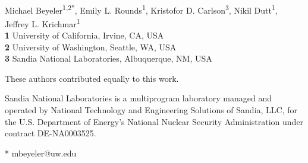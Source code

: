 \documentclass[10pt,letterpaper]{article}
\date{}
\begin{document}
\vspace*{0.2in}

\begin{flushleft}
{\Large
\textbf{} %
}
\newline
\\
Michael Beyeler\textsuperscript{1,2*\Yinyang},
Emily L. Rounds\textsuperscript{1\Yinyang},
Kristofor D. Carlson\textsuperscript{3},
Nikil Dutt\textsuperscript{1},
Jeffrey L. Krichmar\textsuperscript{1}
\\
\bigskip
\textbf{1} University of California, Irvine, CA, USA
\\
\textbf{2} University of Washington, Seattle, WA, USA
\\
\textbf{3} Sandia National Laboratories\dag, Albuquerque, NM, USA
\\
\bigskip

% 
%
\Yinyang These authors contributed equally to this work.



\dag Sandia National Laboratories is a multiprogram laboratory managed and operated by National Technology and Engineering Solutions of Sandia, LLC, for the U.S. Department of Energy's National Nuclear Security Administration under contract DE-NA0003525.


* mbeyeler@uw.edu

\end{flushleft}
\end{document}
